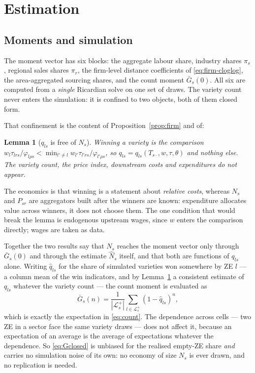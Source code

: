 \documentclass[11pt]{article}
\newtheorem{lemma}{Lemma}
\begin{document}
\section{Estimation}
\label{sec:estimation}

\subsection{Moments and simulation}

The moment vector has six blocks: the aggregate labour share, industry shares $\pi_{s}$, regional
sales shares $\pi_{r}$, the firm-level distance coefficients of \eqref{eq:firm-cloglog}, the
area-aggregated sourcing shares, and the count moment $\bar G_{s}(0)$. All six are computed from a
\emph{single} Ricardian solve on one set of draws. The variety count never enters the simulation:
it is confined to two objects, both of them closed form.

That confinement is the content of Proposition~\ref{prop:firm} and of:

\begin{lemma}[$q_{ls}$ is free of $N_{s}$]
\label{lem:qfree}
Winning a variety is the comparison
$w_{l}\tau_{lrs}/\varphi_{l\rho s}<\min_{l'\neq l}w_{l'}\tau_{l'rs}/\varphi_{l'\rho s}$, so
$q_{ls}=q_{ls}(T_{s\cdot},w,\tau,\theta)$ and nothing else. The variety count, the price index,
downstream costs and expenditures do not appear.
\end{lemma}

The economics is that winning is a statement about \emph{relative costs}, whereas $N_{s}$ and
$P_{sr}$ are aggregators built after the winners are known: expenditure allocates value across
winners, it does not choose them. The one condition that would break the lemma is endogenous
upstream wages, since $w$ enters the comparison directly; wages are taken as data.

Together the two results say that $N_{s}$ reaches the moment vector only through
$\bar G_{s}(0)$ and through the estimate $\widehat N_{s}$ itself, and that both are functions of
$q_{ls}$ alone. Writing $\hat q_{ls}$ for the share of simulated varieties won somewhere by ZE
$l$ --- a column mean of the win indicators, and by Lemma~\ref{lem:qfree} a consistent estimate of
$q_{ls}$ whatever the variety count --- the count moment is evaluated as
\begin{equation}
\bar G_{s}(n)=\frac{1}{|\mathcal{L}^{+}_{s}|}\sum_{l\in\mathcal{L}^{+}_{s}}(1-\hat q_{ls})^{n},
\label{eq:Gclosed}
\end{equation}
which is exactly the expectation in \eqref{eq:count}. The dependence across cells --- two ZE in a
sector face the same variety draws --- does not affect it, because an expectation of an average is
the average of expectations whatever the dependence. So \eqref{eq:Gclosed} is unbiased for the
realised empty-ZE share \emph{and} carries no simulation noise of its own: no economy of size
$N_{s}$ is ever drawn, and no replication is needed.
\end{document}
